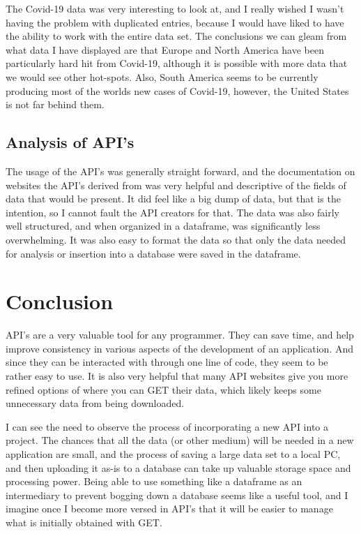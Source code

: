 \documentclass[]{article}
\begin{document}
The Covid-19 data was very interesting to look at, and I really wished I wasn't having the problem with duplicated entries, because I would have liked to have the ability to work with the entire data set.  The conclusions we can gleam from what data I have displayed are that Europe and North America have been particularly hard hit from Covid-19, although it is possible with more data that we would see other hot-spots.  Also, South America seems to be currently producing most of the worlds new cases of Covid-19, however, the United States is not far behind them.
\subsection{Analysis of API's}

The usage of the API's was generally straight forward, and the documentation on websites the API's derived from was very helpful and descriptive of the fields of data that would be present.  It did feel like a big dump of data, but that is the intention, so I cannot fault the API creators for that.  The data was also fairly well structured, and when organized in a dataframe, was significantly less overwhelming.  It was also easy to format the data so that only the data needed for analysis or insertion into a database were saved in the dataframe.  

\section{Conclusion}

API's are a very valuable tool for any programmer.  They can save time, and help improve consistency in various aspects of the development of an application.  And since they can be interacted with through one line of code, they seem to be rather easy to use.  It is also very helpful that many API websites give you more refined options of where you can GET their data, which likely keeps some unnecessary data from being downloaded.

I can see the need to observe the process of incorporating a new API into a project.  The chances that all the data (or other medium) will be needed in a new application are small, and the process of saving a large data set to a local PC, and then uploading it as-is to a database can take up valuable storage space and processing power.  Being able to use something like a dataframe as an intermediary to prevent bogging down a database seems like a useful tool, and I imagine once I become more versed in API's that it will be easier to manage what is initially obtained with GET.
\end{document}
